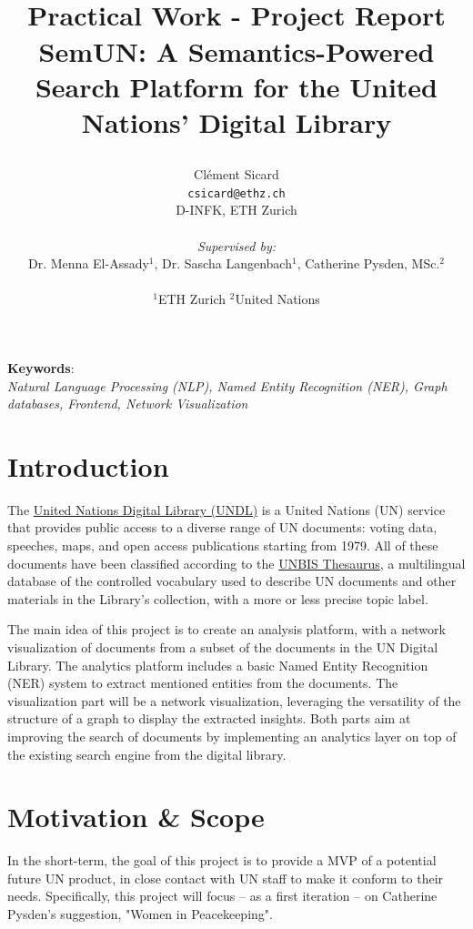 \documentclass[11pt]{article}
\title{
\centering
\begin{minipage}{4cm}
    \centering
    
\end{minipage}
\hfill %
\begin{minipage}{4cm}
    \centering
    
\end{minipage}\\[1cm] %
{\large Practical Work - Project Report}\\
\textbf{SemUN: A Semantics-Powered Search Platform for the United Nations' Digital Library}
}
\author{
    Clément Sicard\\
    \texttt{csicard@ethz.ch}\\
    D-INFK, ETH Zurich\\
    \\
    \textit{Supervised by:}\\
    Dr. Menna El-Assady$^1$, Dr. Sascha Langenbach$^1$, Catherine Pysden, MSc.$^2$\\
    \\
    $^1$ETH Zurich $^2$United Nations
    }
\begin{document}
\maketitle
{}

\begin{center}
    \small\textbf{Keywords}:\\
    \textit{
        Natural Language Processing (NLP),
        Named Entity Recognition (NER),
        Graph databases,
        Frontend,
        Network Visualization
    }
\end{center}

\section{Introduction} \label{sec:introduction}
The \href{https://digitallibrary.un.org/}{United Nations Digital Library (UNDL)} is a United Nations (UN) service that provides public access to a diverse range of UN documents: voting data, speeches, maps, and open access publications starting from 1979.
All of these documents have been classified according to the \href{https://metadata.un.org/thesaurus/about?lang=en}{UNBIS Thesaurus}, a multilingual database of the controlled vocabulary used to describe UN documents and other materials in the Library's collection, with a more or less precise topic label.


The main idea of this project is to create an analysis platform, with a network visualization of documents from a subset of the documents in the UN Digital Library. The analytics platform includes a basic Named Entity Recognition (NER) system to extract mentioned entities from the documents. The visualization part will be a network visualization, leveraging the versatility of the structure of a graph to display the extracted insights. Both parts aim at improving the search of documents by implementing an analytics layer on top of the existing search engine from the digital library.

\section{Motivation \& Scope} \label{sec:motivation-scope}

In the short-term, the goal of this project is to provide a MVP of a potential future UN product, in close contact with UN staff to make it conform to their needs. Specifically, this project will focus – as a first iteration – on Catherine Pysden's suggestion, "Women in Peacekeeping".
\end{document}
